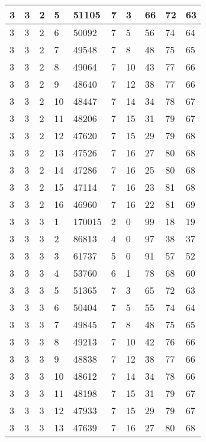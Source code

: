 \begin{table}[!ht]
\begin{tabular}{|l|l|l|l|l|l|l|l|l|l|}
        3 & 3 & 2 & 5 & 51105 & 7 & 3 & 66 & 72 & 63 \\ \hline
        3 & 3 & 2 & 6 & 50092 & 7 & 5 & 56 & 74 & 64 \\ \hline
        3 & 3 & 2 & 7 & 49548 & 7 & 8 & 48 & 75 & 65 \\ \hline
        3 & 3 & 2 & 8 & 49064 & 7 & 10 & 43 & 77 & 66 \\ \hline
        3 & 3 & 2 & 9 & 48640 & 7 & 12 & 38 & 77 & 66 \\ \hline
        3 & 3 & 2 & 10 & 48447 & 7 & 14 & 34 & 78 & 67 \\ \hline
        3 & 3 & 2 & 11 & 48206 & 7 & 15 & 31 & 79 & 67 \\ \hline
        3 & 3 & 2 & 12 & 47620 & 7 & 15 & 29 & 79 & 68 \\ \hline
        3 & 3 & 2 & 13 & 47526 & 7 & 16 & 27 & 80 & 68 \\ \hline
        3 & 3 & 2 & 14 & 47286 & 7 & 16 & 25 & 80 & 68 \\ \hline
        3 & 3 & 2 & 15 & 47114 & 7 & 16 & 23 & 81 & 68 \\ \hline
        3 & 3 & 2 & 16 & 46960 & 7 & 16 & 22 & 81 & 69 \\ \hline
        3 & 3 & 3 & 1 & 170015 & 2 & 0 & 99 & 18 & 19 \\ \hline
        3 & 3 & 3 & 2 & 86813 & 4 & 0 & 97 & 38 & 37 \\ \hline
        3 & 3 & 3 & 3 & 61737 & 5 & 0 & 91 & 57 & 52 \\ \hline
        3 & 3 & 3 & 4 & 53760 & 6 & 1 & 78 & 68 & 60 \\ \hline
        3 & 3 & 3 & 5 & 51365 & 7 & 3 & 65 & 72 & 63 \\ \hline
        3 & 3 & 3 & 6 & 50404 & 7 & 5 & 55 & 74 & 64 \\ \hline
        3 & 3 & 3 & 7 & 49845 & 7 & 8 & 48 & 75 & 65 \\ \hline
        3 & 3 & 3 & 8 & 49213 & 7 & 10 & 42 & 76 & 66 \\ \hline
        3 & 3 & 3 & 9 & 48838 & 7 & 12 & 38 & 77 & 66 \\ \hline
        3 & 3 & 3 & 10 & 48612 & 7 & 14 & 34 & 78 & 66 \\ \hline
        3 & 3 & 3 & 11 & 48198 & 7 & 15 & 31 & 79 & 67 \\ \hline
        3 & 3 & 3 & 12 & 47933 & 7 & 15 & 29 & 79 & 67 \\ \hline
        3 & 3 & 3 & 13 & 47639 & 7 & 16 & 27 & 80 & 68 \\ \hline

\end{tabular}
\end{table}
